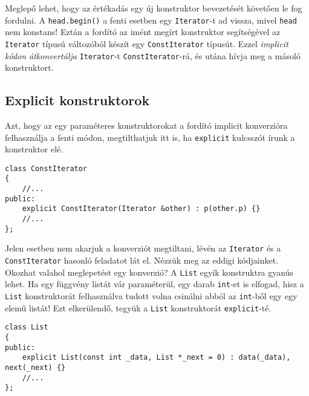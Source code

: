 \documentclass[../cpp_book/cpp_book.tex]{subfiles}
\begin{document}
	Meglepő lehet, hogy az értékadás egy új konstruktor bevezetését követően le fog fordulni. A \texttt{head.begin()} a fenti esetben egy \texttt{Iterator}-t ad vissza, mivel \texttt{head} nem konstans! Eztán a fordító az imént megírt konstruktor segítségével az \texttt{Iterator} típusú változóból készít egy \texttt{ConstIterator} típusút. Ezzel \textit{implicit kódon átkonvertálja} \texttt{Iterator}-t \texttt{ConstIterator}-rá, és utána hívja meg a másoló konstruktort. 
	
	\subsection{Explicit konstruktorok}
	Azt, hogy az egy paraméteres konstruktorokat a fordító implicit konverzióra felhasználja a fenti módon, megtilthatjuk itt is, ha \texttt{explicit} kulcsszót írunk a konstruktor elé.
	
	\begin{lstlisting}
class ConstIterator
{
	//...
public:
	explicit ConstIterator(Iterator &other) : p(other.p) {}
	//...
};
	\end{lstlisting}
	Jelen esetben nem akarjuk a konverziót megtiltani, lévén az \texttt{Iterator} és a \texttt{ConstIterator} hasonló feladatot lát el. Nézzük meg az eddigi kódjainket. Okozhat valahol meglepetést egy konverzió? A \texttt{List} egyik konstruktra gyanús lehet. Ha egy függvény listát vár paraméterül, egy darab \texttt{int}-et is elfogad, hisz a \texttt{List} konstruktorát felhasználva tudott volna csinálni abból az \texttt{int}-ből egy egy elemű listát! Ezt elkerülendő, tegyük a \texttt{List} konstruktorát \texttt{explicit}-té.
	\begin{lstlisting}
class List
{
public:
	explicit List(const int _data, List *_next = 0) : data(_data), next(_next) {}
	//...
};
	\end{lstlisting}
\end{document}
